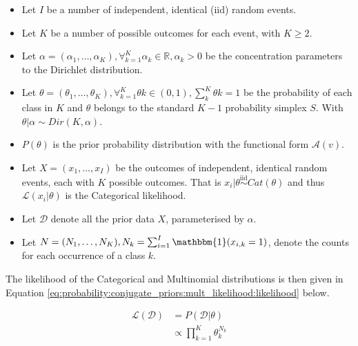 \begin{itemize}
      \item Let $I$ be a number of independent, identical (iid) random events.

      \item Let $K$ be a number of possible outcomes for each event, with $K \geq 2$.

      \item Let $\alpha = (\alpha_{1}, \dots, \alpha_{K}), \forall_{k=1}^{K} \alpha_{k} \in \mathbb{R}, \alpha_{k} > 0$ be the concentration parameters to the Dirichlet distribution.

      \item Let $\theta = (\theta_{1}, \dots, \theta_{K}), \forall_{k=1}^{K} \theta{k} \in (0,1), \sum_{k}^{K} \theta{k} = 1$ be the probability of each class in $K$ and $\theta$ belongs to the standard $K-1$ probability simplex $S$. With $\theta | \alpha \sim Dir(K, \alpha)$.

      \item $P(\theta)$ is the prior probability distribution with the functional form $\mathcal{A}(v)$.

      \item Let $X = (x_{1}, \dots, x_{I})$ be the outcomes of independent, identical random events, each with $K$ possible outcomes. That is $x_{i} | \theta \overset{\text{iid}}{\sim} Cat(\theta)$ and thus $\mathcal{L}(x_{i} \vert \theta)$ is the Categorical likelihood.

      \item Let $\mathcal{D}$ denote all the prior data $X$, parameterised by $\alpha$.

      \item Let $N = (N_{1}, \dots, N_{K}), N_{k} = \sum_{i=1}^{I} \mathbbm{1}(x_{i,k} = 1)$, denote the counts for each occurrence of a class $k$.
\end{itemize}

The likelihood of the Categorical and Multinomial distributions is then given in Equation \ref{eq:probability:conjugate_priors:mult_likelihood:likelihood} below.

\begin{equation}
      \label{eq:probability:conjugate_priors:mult_likelihood:likelihood}
      \begin{split}
            \mathcal{L}(\mathcal{D}) &=  P(\mathcal{D} | \theta) \\
            &\propto \prod_{k=1}^{K} \theta_{k}^{N_{k}}
      \end{split}
\end{equation}

